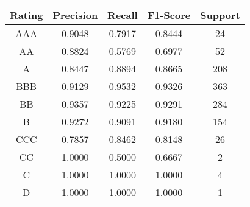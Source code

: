 \footnotesize
\begin{tabular}{ccccc}
\toprule
Rating & Precision & Recall & F1-Score & Support \\
\midrule
AAA & 0.9048 & 0.7917 & 0.8444 & 24 \\
AA & 0.8824 & 0.5769 & 0.6977 & 52 \\
A & 0.8447 & 0.8894 & 0.8665 & 208 \\
BBB & 0.9129 & 0.9532 & 0.9326 & 363 \\
BB & 0.9357 & 0.9225 & 0.9291 & 284 \\
B & 0.9272 & 0.9091 & 0.9180 & 154 \\
CCC & 0.7857 & 0.8462 & 0.8148 & 26 \\
CC & 1.0000 & 0.5000 & 0.6667 & 2 \\
C & 1.0000 & 1.0000 & 1.0000 & 4 \\
D & 1.0000 & 1.0000 & 1.0000 & 1 \\
\bottomrule
\end{tabular}

\normalsize
